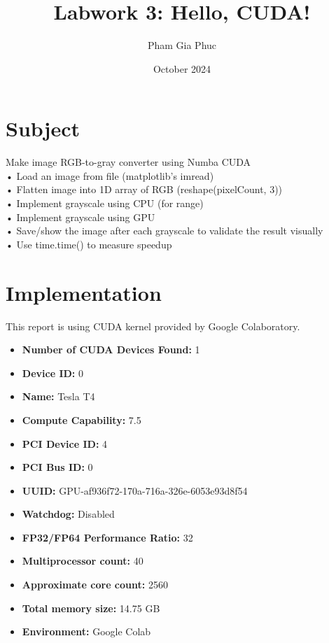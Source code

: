 \documentclass{article}
\title{Labwork 3: Hello, CUDA!}
\author{Pham Gia Phuc}
\date{October 2024}
\begin{document}
\maketitle

\setlength\parindent{0pt}

\section{Subject}

        Make image RGB-to-gray converter using Numba CUDA \\
        • Load an image from file (matplotlib’s imread) \\
        • Flatten image into 1D array of RGB (reshape(pixelCount, 3)) \\
        • Implement grayscale using CPU (for range) \\
        • Implement grayscale using GPU \\
        • Save/show the image after each grayscale to validate the result visually \\
        • Use time.time() to measure speedup \\
        
    
\section{Implementation}
    
        This report is using CUDA kernel provided by Google Colaboratory.
        
        \begin{itemize}
            \item \textbf{Number of CUDA Devices Found:} 1
            \item \textbf{Device ID:} 0
            \item \textbf{Name:} Tesla T4
            \item \textbf{Compute Capability:} 7.5
            \item \textbf{PCI Device ID:} 4
            \item \textbf{PCI Bus ID:} 0
            \item \textbf{UUID:} GPU-af936f72-170a-716a-326e-6053e93d8f54
            \item \textbf{Watchdog:} Disabled
            \item \textbf{FP32/FP64 Performance Ratio:} 32
            \item \textbf{Multiprocessor count:} 40
            \item \textbf{Approximate core count:} 2560
            \item \textbf{Total memory size:} 14.75 GB \\
            \item \textbf{Environment:} Google Colab \\
        \end{itemize}
    
\end{document}
